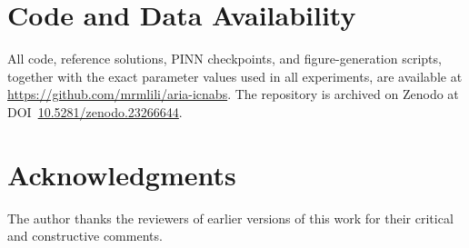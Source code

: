 \documentclass[11pt]{article}
\begin{document}
\section*{Code and Data Availability}
\label{sec:code}
All code, reference solutions, PINN checkpoints, and figure-generation scripts, together with the exact parameter values used in all experiments, are available at \url{https://github.com/mrmlili/aria-icnabs}. The repository is archived on Zenodo at DOI~\href{https://doi.org/10.5281/zenodo.23266644}{10.5281/zenodo.23266644}.

\section*{Acknowledgments}
The author thanks the reviewers of earlier versions of this work for their critical and constructive comments.
\end{document}
